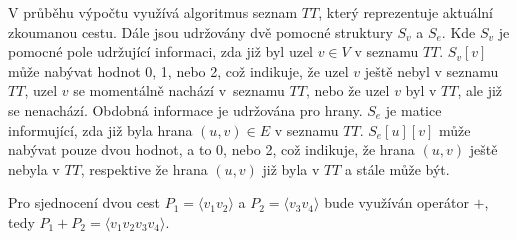         \vspace*{1em}
        V průběhu výpočtu využívá algoritmus seznam $TT$, který reprezentuje aktuální zkoumanou cestu. Dále jsou udržovány dvě pomocné struktury $S_v$ a $S_e$. Kde $S_v$ je pomocné pole udržující informaci, zda již byl uzel $v \in V$ v seznamu $TT$. $S_v[v]$ může nabývat hodnot 0, 1, nebo 2, což indikuje, že uzel $v$ ještě nebyl v seznamu $TT$, uzel $v$ se momentálně nachází v~seznamu $TT$, nebo že uzel $v$ byl v $TT$, ale již se nenachází. Obdobná informace je udržována pro hrany. $S_e$ je matice informující, zda již byla hrana $(u, v) \in E$ v seznamu $TT$. $S_e[u][v]$ může nabývat pouze dvou hodnot, a to 0, nebo 2, což indikuje, že hrana $(u, v)$ ještě nebyla v $TT$, respektive že hrana $(u, v)$ již byla v $TT$ a stále může být.

        Pro sjednocení dvou cest $P_1 = \langle v_1v_2 \rangle$ a $P_2 = \langle v_3v_4 \rangle$ bude využíván operátor $+$, tedy $P_1 + P_2 = \langle v_1v_2v_3v_4 \rangle$.

